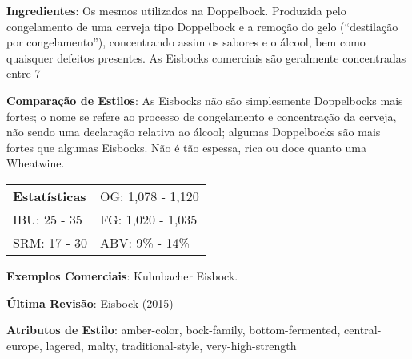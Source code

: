 \textbf{Ingredientes}: Os mesmos utilizados na Doppelbock. Produzida pelo congelamento de uma cerveja tipo Doppelbock e a remoção do gelo (“destilação por congelamento”), concentrando assim os sabores e o álcool, bem como quaisquer defeitos presentes. As Eisbocks comerciais são geralmente concentradas entre 7%

\textbf{Comparação de Estilos}: As Eisbocks não são simplesmente Doppelbocks mais fortes; o nome se refere ao processo de congelamento e concentração da cerveja, não sendo uma declaração relativa ao álcool; algumas Doppelbocks são mais fortes que algumas Eisbocks. Não é tão espessa, rica ou doce quanto uma Wheatwine.

\begin{tabular}{@{}p{35mm}p{35mm}@{}}
  \textbf{Estatísticas} & OG: 1,078 - 1,120 \\
  IBU: 25 - 35 & FG: 1,020 - 1,035 \\
  SRM: 17 - 30 & ABV: 9\% - 14\%
\end{tabular}

\textbf{Exemplos Comerciais}: Kulmbacher Eisbock.

\textbf{Última Revisão}: Eisbock (2015)

\textbf{Atributos de Estilo}: amber-color, bock-family, bottom-fermented, central-europe, lagered, malty, traditional-style, very-high-strength

